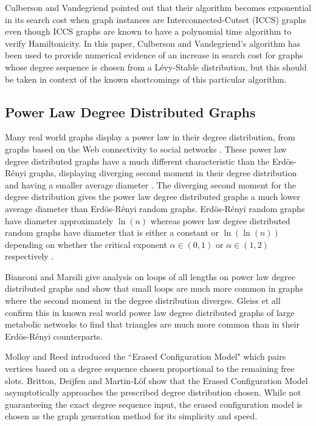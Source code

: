 \documentclass[twoside,11pt]{article}
\begin{document}
Culberson and Vandegriend pointed out that their algorithm becomes exponential in its
search cost when graph instances are Interconnected-Cutset (ICCS) graphs even though
ICCS graphs are known to have a polynomial time algorithm to verify
Hamiltonicity.  
In this paper, Culberson and Vandegriend's algorithm has been used
to provide numerical evidence of an increase in search cost for graphs 
whose degree
sequence is chosen from a L\'evy-Stable distribution, but this should be taken
in context of the known shortcomings of this particular algorithm.

\subsection{Power Law Degree Distributed Graphs}

Many real world graphs display a power law in their degree distribution, from graphs based
on the Web connectivity \cite{adamic} to social networks \cite{albert,newman}.  These
power law degree distributed graphs have a much different characteristic than the Erd\"os-R\'enyi graphs, displaying diverging second moment in their
degree distribution and having a smaller average diameter
\cite{esker_hofstad_hooghiemstra_znamenski,hofstad_hooghiemstra_mieghem,hofstad_hooghiemstra_znamensi}.
The diverging second moment for the degree distribution gives the power law degree distributed graphs a much lower average diameter than
Erd\"os-R\'enyi random graphs.  Erd\"os-R\'enyi random graphs have diameter approximately $\ln(n)$ whereas power law degree distributed
random graphs have diameter that is either a constant or $\ln(\ln(n))$ depending on whether the critical exponent $\alpha \in (0, 1)$ or
$\alpha \in (1, 2)$ respectively  \cite{esker_hofstad_hooghiemstra_znamenski,hofstad_hooghiemstra_mieghem,hofstad_hooghiemstra_znamensi}.

Bianconi and Marsili \citeyear{bianconi} give analysis
on loops of all lengths on power law degree distributed graphs and show
that small loops are much more common in graphs 
where the second moment
in the degree distribution diverges.  Gleiss et all \citeyear{gleiss_stadler_wagner}
confirm this in known real world power law degree distributed graphs
of large metabolic networks to find that triangles are much more common
than in their Erd\"os-R\'enyi counterparts.

Molloy and Reed \citeyear{molloy} introduced the
``Erased Configuration Model" which pairs vertices based on a degree sequence
chosen proportional to the remaining free slots.
Britton, Deijfen and Martin-L\"of \citeyear{britton}
show that the
Erased Configuration Model
asymptotically approaches the prescribed degree distribution chosen.
While not guaranteeing the exact degree sequence input, the erased configuration model is
chosen as the graph generation method 
for its simplicity and speed.
\end{document}
